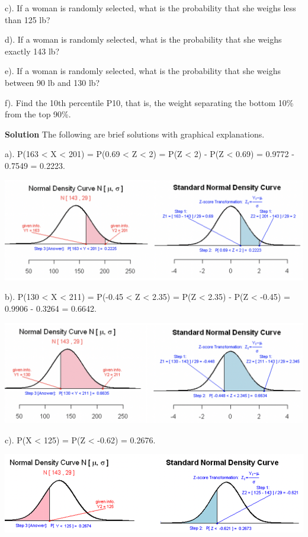 \documentclass[
]{book}
\begin{document}
c). If a woman is randomly selected, what is the probability that she weighs less than 125 lb?

d). If a woman is randomly selected, what is the probability that she weighs exactly 143 lb?

e). If a woman is randomly selected, what is the probability that she weighs between 90 lb and 130 lb?

f). Find the 10th percentile P10, that is, the weight separating the bottom 10\% from the top 90\%.

\textbf{Solution} The following are brief solutions with graphical explanations.

a). P(163 \textless{} X \textless{} 201) = P(0.69 \textless{} Z \textless{} 2) = P(Z \textless{} 2) - P(Z \textless{} 0.69) = 0.9772 - 0.7549 = 0.2223.\\

\begin{center}\includegraphics[width=0.6\linewidth]{week04/example09a} \end{center}

b). P(130 \textless{} X \textless{} 211) = P(-0.45 \textless{} Z \textless{} 2.35) = P(Z \textless{} 2.35) - P(Z \textless{} -0.45) = 0.9906 - 0.3264 = 0.6642.\\

\begin{center}\includegraphics[width=0.6\linewidth]{week04/example09b} \end{center}

c). P(X \textless{} 125) = P(Z \textless{} -0.62) = 0.2676.\\

\begin{center}\includegraphics[width=0.6\linewidth]{week04/example09c} \end{center}
\end{document}
